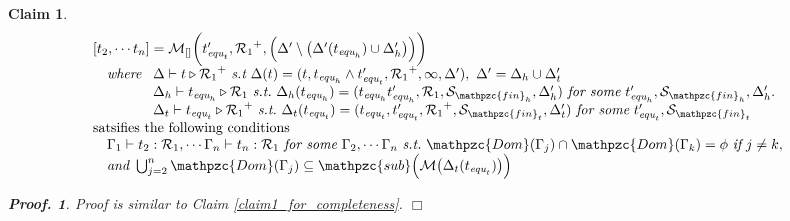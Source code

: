 \documentclass[12pt]{article}
\newtheorem{Claim}{Claim}[section]
\newtheorem{Proof}{Proof.}
\begin{document}
\begin{Claim}
  \label{claim2_for_completeness}
  \[ \begin{array}{l}
      [t_2, \cdots t_n] = \mathcal{M}_{[]}\biggl(t'_{\text{\it equ}_t},
       {\mathcal{R}_1}^+, \Bigl(\Delta' \setminus \bigl(\Delta'(
        t_{\text{\it equ}_h}) \cup \Delta'_h \bigr) \Bigr) \biggr)  \\
         \quad \text{\it where}\ \begin{array}[t]{l}
           \Delta \vdash t \triangleright {\mathcal{R}_1}^+\ \text{\it s.t}\
            \Delta(t) = (t, t_{\text{\it equ}_h} \wedge
             t'_{\text{\it equ}_t}, {\mathcal{R}_1}^+, \infty, \Delta' ),\
              \Delta' = \Delta_h \cup \Delta'_t  \\
           \Delta_h \vdash t_{\text{\it equ}_h} \triangleright
            \mathcal{R}_1\ \text{\it s.t.}\ 
             \Delta_h(t_{\text{\it equ}_h}) = (t_{\text{\it equ}_h}
              t'_{\text{\it equ}_h}, \mathcal{R}_1,
               \mathcal{S}_{\mathpzc{fin}_h}, \Delta'_h )\
                \text{\it for some}\ t'_{\text{\it equ}_h},
                 \mathcal{S}_{\mathpzc{fin}_h}, \Delta'_h.  \\ 
           \Delta_t \vdash t_{\text{\it equ}_t} \triangleright
            {\mathcal{R}_1}^+\ \text{\it s.t.}\
             \Delta_t(t_{\text{\it equ}_t}) =(t_{\text{\it equ}_t},
              t'_{\text{\it equ}_t}, {\mathcal{R}_1}^+,
               \mathcal{S}_{\mathpzc{fin}_t}, \Delta'_t)\
                \text{\it for some}\ t'_{\text{\it equ}_t},
                 \mathcal{S}_{\mathpzc{fin}_t}
         \end{array}  \\
      \mbox{satsifies the following conditions}\\
       \quad \Gamma_1 \vdash t_2: \mathcal{R}_1, \cdots
        \Gamma_n \vdash t_n: \mathcal{R}_1\ \text{\it for some}\
         \Gamma_2, \cdots \Gamma_n\ \text{\it s.t.}\
          \mathpzc{Dom}(\Gamma_j) \cap \mathpzc{Dom}(\Gamma_k) = \phi\
           \text{\it if}\ j \neq k,  \\
       \quad \text{\it and}\ \bigcup_{j=2}^n\mathpzc{Dom}(\Gamma_j)
        \subseteq \mathpzc{sub}\Bigl(\mathcal{M}\bigl(
         \Delta_t(t_{\text{\it equ}_t}) \bigr) \Bigr)
     \end{array}
  \]
  \begin{Proof}
    Proof is similar to Claim \ref{claim1_for_completeness}.
    $\Box$
  \end{Proof}
\end{Claim}
\end{document}
